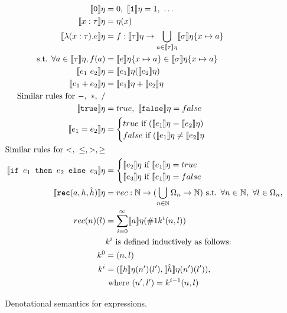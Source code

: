  \begin{figure}
 \begin{align*}
 \llbracket \texttt{0} \rrbracket\eta &= 0, \  \llbracket \texttt{1} \rrbracket\eta = 1, \ \ldots \\
  \llbracket x : \tau \rrbracket\eta &= \eta(x) \\
  \llbracket \lambda (x : \tau) . e \rrbracket\eta &= f : \llbracket \tau \rrbracket\eta 
  \rightarrow \bigcup_{a \in \llbracket \tau \rrbracket\eta} \llbracket \sigma \rrbracket\eta\{x\mapsto a\} \\
\text{ s.t. } \forall a \in \llbracket \tau \rrbracket\eta, f(a) &= \llbracket e \rrbracket\eta\{ x \mapsto a \} 
  \in \llbracket \sigma \rrbracket\eta\{x\mapsto a\}\\
 \llbracket e_1 \ e_2 \rrbracket \eta &= \llbracket e_1 \rrbracket\eta ( \llbracket e_2 \rrbracket\eta ) \\
 \llbracket e_1 + e_2 \rrbracket\eta &= \llbracket e_1 \rrbracket\eta + \llbracket e_2 \rrbracket\eta \\
\text{Similar rules for $-, \ *, \ /$} \\
  \llbracket \texttt{true} \rrbracket\eta &= true, \ \llbracket \texttt{false} \rrbracket\eta = false \\
 \llbracket e_1 = e_2 \rrbracket\eta &= 
 \begin{cases} 
      true \text{ if } (\llbracket e_1 \rrbracket\eta = \llbracket e_2 \rrbracket\eta) \\
      false \text{  if } (\llbracket e_1 \rrbracket\eta \neq \llbracket e_2\rrbracket\eta\\
   \end{cases} \\
\text{Similar rules for $<, \ \leq, >, \geq$} \\
  \llbracket \ifelse{e_1}{e_2}{e_3} \rrbracket \eta &= 
 \begin{cases} 
      \llbracket e_2 \rrbracket\eta \text{ if } \llbracket e_1 \rrbracket\eta = true \\
      \llbracket e_3 \rrbracket\eta \text{ if } \llbracket e_1 \rrbracket\eta = false \\ 
   \end{cases}
  \\
    \llbracket  \texttt{rec} (a, h, \hat{h}) \rrbracket\eta &= rec: \N \rightarrow 
    (\bigcup_{n\in \N} \Omega_n \rightarrow \N) \text{ s.t. } \forall n \in \N, \ 
    \forall l \in \Omega_n, \\
    rec(n)(l) &= \sum_{i=0}^{\infty} \llbracket a \rrbracket\eta(\#1k^i(n,l)) \\
    &k^i \text{ is defined inductively as follows:} \\
    k^0 &= (n, l) \\
    k^i &= (\llbracket h \rrbracket\eta (n') (l'), \llbracket \hat{h} \rrbracket\eta (n') (l')), \\
    &\text{ where } (n',l') = k^{i-1}(n, l) 
 \end{align*}
 \caption{Denotational semantics for expressions.}
 \end{figure}


